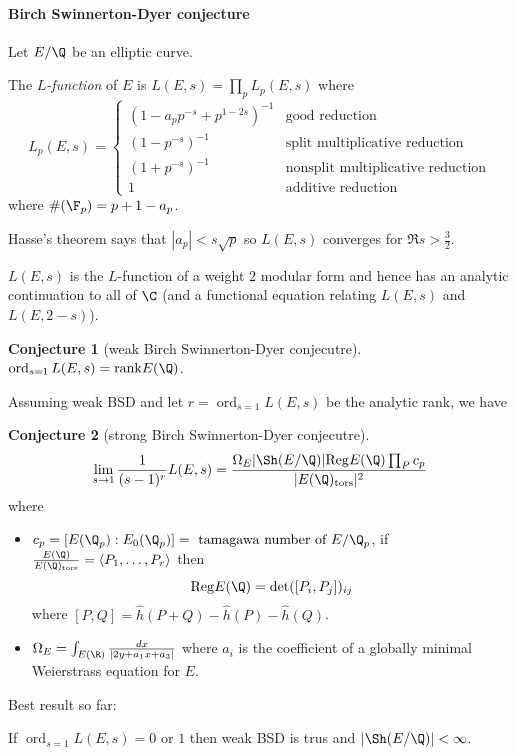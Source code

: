 \documentclass[a4paper]{article}
\theoremstyle{definition}
\theoremstyle{theorem}
\newtheorem*{conjecture}{Conjecture}
\DeclareMathOperator{\ord}{ord}
\begin{document}
\paragraph{Birch Swinnerton-Dyer conjecture}

Let \(E/\Q\) be an elliptic curve.

\begin{definition}[\(l\)-function]
  The \emph{\(L\)-function} of \(E\) is \(L(E, s) = \prod_p L_p(E, s)\) where
  \[
    L_p(E, s) =
    \begin{cases}
      (1 - a_p p^{-s} + p^{1 - 2s})^{-1} & \text{good reduction} \\
      (1 - p^{-s})^{-1} & \text{split multiplicative reduction} \\
      (1 + p^{-s})^{-1} & \text{nonsplit multiplicative reduction} \\
      1 & \text{additive reduction}
    \end{cases}
  \]
  where \(\#(\F_p) = p + 1 - a_p\).
\end{definition}

Hasse's theorem says that \(|a_p| < s \sqrt p\) so \(L(E, s)\) converges for \(\Re s > \frac{3}{2}\).

\begin{theorem}
  \(L(E, s)\) is the \(L\)-function of a weight \(2\) modular form and hence has an analytic continuation to all of \(\C\) (and a functional equation relating \(L(E, s)\) and \(L(E, 2 - s)\)).
\end{theorem}

\begin{conjecture}[weak Birch Swinnerton-Dyer conjecutre]
  \(\ord_{s = 1} L(E, s) = \mathrm{rank} E(\Q)\).
\end{conjecture}

Assuming weak BSD and let \(r = \ord_{s = 1} L(E, s)\) be the analytic rank, we have

\begin{conjecture}[strong Birch Swinnerton-Dyer conjecutre]
  \[
    \lim_{s \to 1} \frac{1}{(s - 1)^r} L(E, s) = \frac{\Omega_E |\Sh(E/\Q)| \mathrm{Reg} E(\Q) \prod_P c_p}{|E(\Q)_{\mathrm{tors}}|^2}
  \]
  where
  \begin{itemize}
  \item \(c_p = [E(\Q_p): E_0(\Q_p)] = \text{ tamagawa number of } E/\Q_p\), if \(\frac{E(\Q)}{E(\Q)_{\mathrm{tors}}} = \langle P_1, \dots, P_r \rangle\) then
    \[
      \mathrm{Reg} E(\Q) = \det ([P_i, P_j])_{ij}
    \]
    where \([P, Q] = \hat h (P + Q) - \hat h(P) - \hat h(Q)\).
  \item \(\Omega_E = \int_{E(\R)} \frac{dx}{|2y + a_1x + a_3|}\) where \(a_i\) is the coefficient of a globally minimal Weierstrass equation for \(E\).
  \end{itemize}
\end{conjecture}

Best result so far:

\begin{theorem}[Kolvragin]
  If \(\ord_{s = 1} L(E, s) = 0\) or \(1\) then weak BSD is trus and \(|\Sh (E/\Q)| < \infty\).
\end{theorem}

\printindex
\end{document}
